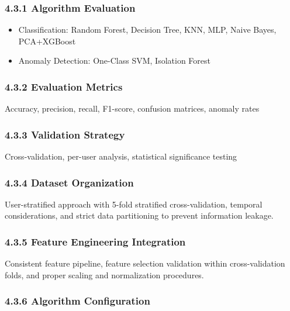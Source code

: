 \documentclass[
  11pt,
  a4paper,
]{article}
\providecommand{\tightlist}{%
  \setlength{\itemsep}{0pt}\setlength{\parskip}{0pt}}
\begin{document}
\subsubsection{4.3.1 Algorithm Evaluation}\label{algorithm-evaluation}

\begin{itemize}
\tightlist
\item
  Classification: Random Forest, Decision Tree, KNN, MLP, Naive Bayes,
  PCA+XGBoost
\item
  Anomaly Detection: One-Class SVM, Isolation Forest
\end{itemize}

\subsubsection{4.3.2 Evaluation Metrics}\label{evaluation-metrics}

Accuracy, precision, recall, F1-score, confusion matrices, anomaly rates

\subsubsection{4.3.3 Validation Strategy}\label{validation-strategy}

Cross-validation, per-user analysis, statistical significance testing

\subsubsection{4.3.4 Dataset Organization}\label{dataset-organization}

User-stratified approach with 5-fold stratified cross-validation,
temporal considerations, and strict data partitioning to prevent
information leakage.

\subsubsection{4.3.5 Feature Engineering
Integration}\label{feature-engineering-integration}

Consistent feature pipeline, feature selection validation within
cross-validation folds, and proper scaling and normalization procedures.

\subsubsection{4.3.6 Algorithm
Configuration}\label{algorithm-configuration}
\end{document}

